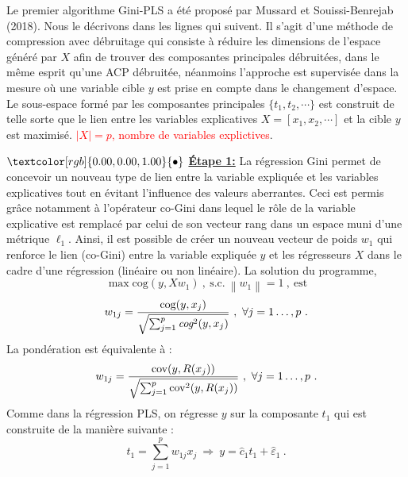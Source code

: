 \documentclass[a4paper, 12pt]{article}
\newcommand{\bulle}{\textcolor[rgb]{0.00,0.00,1.00}{\bullet}}
\newcommand{\cov}{\text{cov}}
\newcommand{\cog}{\text{cog}}
\numberwithin{equation}{section}
\begin{document}
Le premier algorithme Gini-PLS a été proposé par Mussard et Souissi-Benrejab (2018). Nous le décrivons dans les lignes qui suivent. Il s'agit d'une méthode de compression avec débruitage qui consiste à réduire les dimensions de l'espace généré par $X$ afin de trouver des composantes principales débruitées, dans le même esprit qu'une ACP débruitée, néanmoins l'approche est supervisée dans la mesure où une variable cible $y$ est prise en compte dans le changement d'espace. Le sous-espace formé par les composantes principales $\{t_1,t_2,\cdots\}$ est construit de telle sorte que le lien entre les variables explicatives $X = [x_1,x_2,\cdots]$ et la cible $y$ est maximisé.  \textcolor{red}{$\vert X \vert = p$, nombre de variables explictives}.

\medskip

$\bulle$ \underline{\textbf{Étape 1:}} La régression Gini permet de concevoir un nouveau type de lien entre la variable expliquée et les variables explicatives tout en évitant l'influence des valeurs aberrantes. Ceci est permis grâce notamment à l'opérateur co-Gini dans lequel le rôle de la variable explicative est remplacé par celui de son vecteur rang dans un espace muni d'une métrique $\ell_1$.  Ainsi, il est possible de créer un nouveau vecteur de poids $w_1$ qui renforce le lien (co-Gini) entre la variable expliquée $y$ et les régresseurs $X$ dans le cadre d'une régression (linéaire ou non linéaire).
\newline La solution du programme,
\[
\max \cog(y,X w_1) \ , \ \text{s.c.} \ \left\|w_1\right\|=1 \ , \ \text{est}
\]
\begin{equation}\notag
w_{1j} = \frac{\cog(y,x_j)}{\sqrt{\sum_{j=1}^p \emph{cog}^2(y,x_j)}} \ , \ \forall j = 1\ldots,p \ .
\end{equation}
La pondération est équivalente à :
\begin{equation}\notag
w_{1j} = \frac{\cov(y,R(x_j))}{\sqrt{\sum_{j=1}^p \cov^2(y,R(x_j))}} \ , \ \forall j = 1\ldots,p \ .
\end{equation}
Comme dans la régression PLS, on régresse $y$ sur la composante $t_1$ qui est construite de la manière suivante :
\[
t_1 = \sum_{j=1}^p w_{1j}x_j \ \Longrightarrow \ y = \hat{c}_1 t_1 + \hat{\varepsilon}_1 \ .
\]

\medskip
\end{document}
